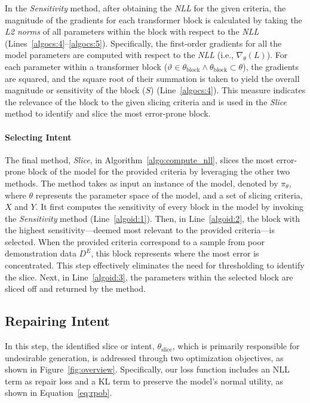 In the \textit{Sensitivity} method, after obtaining the \textit{NLL} for the given criteria, the magnitude of the gradients for each transformer block is calculated by taking the \textit{L2 norms} of all parameters within the block with respect to the \textit{NLL} (Lines~\ref{algocs:4}–\ref{algocs:5}). Specifically, the first-order gradients for all the model parameters are computed with respect to the \textit{NLL} (i.e., $\nabla_\theta (L)$). For each parameter within a transformer block ($\vartheta \in \theta_{\text{block}} \land \theta_{\text{block}} \subset \theta$), the gradients are squared, and the square root of their summation is taken to yield the overall magnitude or sensitivity of the block ($S$) (Line~\ref{algocs:4}). This measure indicates the relevance of the block to the given slicing criteria and is used in the \textit{Slice} method to identify and slice the most error-prone block.



\paragraph{Selecting Intent}


The final method, \textit{Slice}, in Algorithm~\ref{algo:compute_nll}, slices the most error-prone block of the model for the provided criteria by leveraging the other two methods. The method takes as input an instance of the model, denoted by \( \pi_{\theta} \), where $\theta$ represents the parameter space of the model, and a set of slicing criteria, \( X \) and \( Y \). It first computes the sensitivity of every block in the model by invoking the \textit{Sensitivity} method (Line~\ref{algoid:1}). Then, in Line~\ref{algoid:2}, the block with the highest sensitivity—deemed most relevant to the provided criteria—is selected. When the provided criteria correspond to a sample from poor demonstration data \( D^E \), this block represents where the most error is concentrated. This step effectively eliminates the need for thresholding to identify the slice. Next, in Line~\ref{algoid:3}, the parameters within the selected block are sliced off and returned by the method.





\subsection{Repairing Intent}


In this step, the identified slice or intent, $\theta_{\text{slice}}$, which is primarily responsible for undesirable generation, is addressed through two optimization objectives, as shown in Figure~\ref{fig:overview}. Specifically, our loss function includes an NLL term as repair loss and a KL term to preserve the model's normal utility, as shown in Equation~\ref{eq:rpob}.



